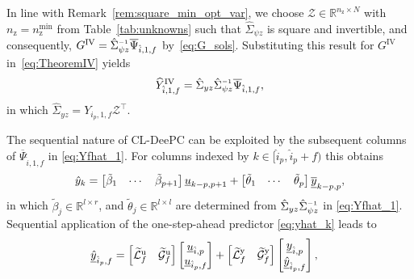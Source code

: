 In line with Remark~\ref{rem:square_min_opt_var}, we choose $\mathcal{Z}\in\mathbb{R}^{n_\mathrm{z}\times N}$ with $n_\mathrm{z}=n_\mathrm{z}^\mathrm{min}$ from Table~\ref{tab:unknowns} such that $\hat{\Sigma}_{\psi z}$ is square and invertible, and consequently,  ${G^\mathrm{IV} = \hat{\Sigma}_{\psi z}\inv\overline{\Psi}_{\hat{i},1,f}}$ by~\eqref{eq:G_sols}. Substituting this result for $G^\mathrm{IV}$ in~\eqref{eq:TheoremIV} yields
\begin{align}\label{eq:Yfhat_1}
\widehat{Y}_{\hat{i},1,f}^\mathrm{IV}=\hat{\Sigma}_{yz}\hat{\Sigma}_{\psi z}\inv\overline{\Psi}_{\hat{i},1,f},
\end{align}
in which $\hat{\Sigma}_{yz}=Y_{i_p,1,f}\mathcal{Z}^\top$.

The sequential nature of \ac{CL-DeePC} can be exploited by the subsequent columns of $\overline{\Psi}_{\hat{i},1,f}$ in \eqref{eq:Yfhat_1}. For columns indexed by $k\in[\hat{i}_p,\hat{i}_p+f)$ this obtains
\begin{align}\label{eq:yhat_k}
    \hat{y}_{k} = \begin{bmatrix} \tilde{\beta}_1 & \cdots & \tilde{\beta}_{p+1} \end{bmatrix} \datavec{u}{k-p,p+1} + \begin{bmatrix} \tilde{\theta}_1 & \cdots & \tilde{\theta}_{p} \end{bmatrix} \datavec{\overline{y}}{k-p,p},%
\end{align}
in which $\tilde{\beta}_j\in\mathbb{R}^{l\times r}$, and $\tilde{\theta}_j\in\mathbb{R}^{l\times l}$ are determined from $\hat{\Sigma}_{yz}\hat{\Sigma}_{\psi z}\inv$ in \eqref{eq:Yfhat_1}. Sequential application of the one-step-ahead predictor \eqref{eq:yhat_k} leads to
\begin{align}\label{eq:Sequential1}
    \underline{\hat{y}}_{\hat{i}_p,f} &=
    \begin{bmatrix}
        \widetilde{\mathcal{L}}^\mathrm{u}_f & \widetilde{\mathcal{G}}^\mathrm{u}_f 
    \end{bmatrix}    
    \begin{bmatrix}
        \underline{u}_{\hat{i},p}\\
        \underline{u}_{\hat{i}_p,f}
    \end{bmatrix}+
    \begin{bmatrix}
        \widetilde{\mathcal{L}}^\mathrm{y}_f & \widetilde{\mathcal{G}}^\mathrm{y}_f 
    \end{bmatrix}    
    \begin{bmatrix}
        \underline{y}_{\hat{i},p}\\
        \underline{\hat{y}}_{\hat{i}_p,f}
    \end{bmatrix},
\end{align}
